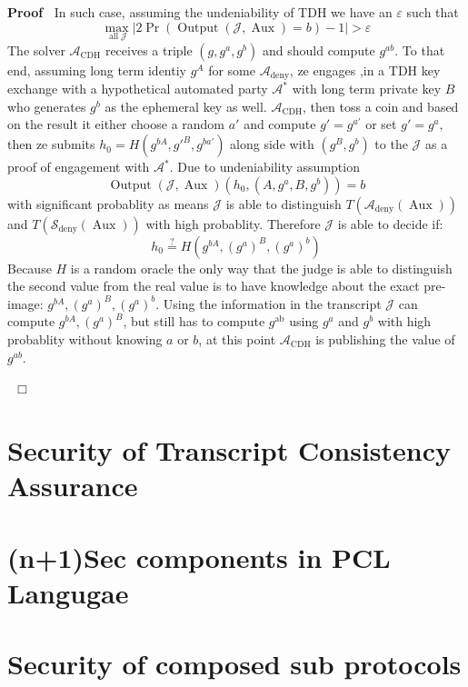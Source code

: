 \documentclass{article}
\newcommand{\nocomma}{}
\newcommand{\tmop}[1]{\ensuremath{\operatorname{#1}}}
\newenvironment{proof}{\noindent\textbf{Proof\ }}{\hspace*{\fill}$\Box$\medskip}
\providecommand{\xequal}[2][]{\mathop{=}\limits_{#1}^{#2}}
\begin{document}
\begin{proof}
  In such case, assuming the undeniability of TDH we have an $\varepsilon$
  such that
  \[  \max_{\tmop{all} \mathcal{J}} |2 \Pr (\tmop{Output} (\mathcal{J},
     \tmop{Aux}) = b) - 1| > \varepsilon \]
  The solver $\mathcal{A}_{\tmop{CDH}}$ receives a triple $(g, g^a, g^b)$ and
  should compute $g^{a b}$. To that end, assuming long term identiy $g^A$ for
  some $\mathcal{A}_{\tmop{deny}}$, ze engages ,in a TDH key exchange with a
  hypothetical automated party $\mathcal{A}^{\ast}$ with long term private key
  $B$ who generates $g^b$ as the ephemeral key as well.
  $\mathcal{A}_{\tmop{CDH}}$, then toss a coin and based on the result it
  either choose a random $a'$ and compute $g' = g^{a'}$ or set $g' = g^a,$then
  ze submits $h_0 = H (g^{b A} \nocomma, g'^B, g^{b a'})$ along side with
  $(g^B, g^b)$ to the $\mathcal{J}$ as a proof of engagement with
  $\mathcal{A}^{\ast}$. Due to undeniability assumption
  \[ \tmop{Output} (\mathcal{J}, \tmop{Aux}) (h_0, (A, g^a, B, g^b)) = b \]
  with significant probablity as means $\mathcal{J}$ is able to distinguish $T
  (\mathcal{A}_{\tmop{deny}} (\tmop{Aux}))$ and $T (\mathcal{S}_{\tmop{deny}}
  (\tmop{Aux}))$ with high probablity. Therefore $\mathcal{J}$ is able to
  decide if:
  \[ h_0 \xequal{?} \nocomma H (g^{b A} \nocomma, (g^a)^B, (g^a)^b) \]
  Because $H$ is a random oracle the only way that the judge is able to
  distinguish the second value from the real value is to have knowledge about
  the exact pre-image: $g^{b A} \nocomma, (g^a)^B, (g^a)^b$. Using the
  information in the transcript $\mathcal{J}$ can compute $g^{b A} \nocomma,
  (g^a)^B$, but still has to compute $g^{\tmop{ab}}$ using $g^a$ and $g^b$
  with high probablity without knowing $a$ or $b$, at this point
  $\mathcal{A}_{\tmop{CDH}}$ is publishing the value of $g^{a b}$.
  
  \ 
\end{proof}

\section{Security of Transcript Consistency Assurance}

\label{sect-tca-sec}

\section{(n+1)Sec components in PCL Langugae}

\label{sect-np1sec-pclize}

\section{Security of composed sub protocols}

\label{sect-comp-sec}
\end{document}
